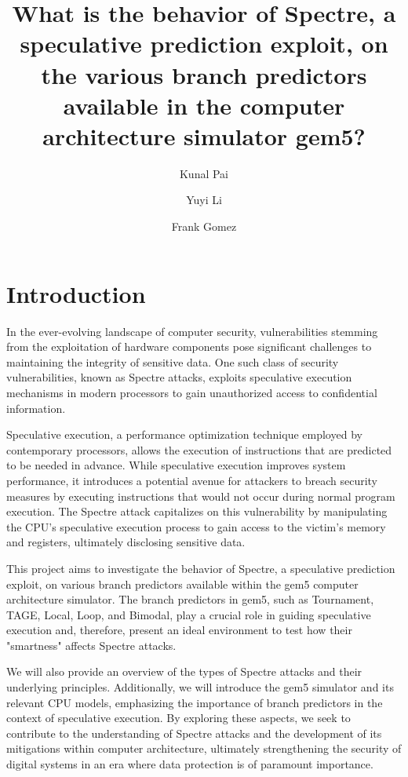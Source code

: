 \documentclass[twocolumn,showpacs,%
  nofootinbib,aps,superscriptaddress,%
  eqsecnum,prd,notitlepage,showkeys,10pt]{revtex4-1}
\begin{document}
\title{What is the behavior of Spectre, a speculative prediction exploit, on the various branch predictors available in the computer architecture simulator gem5?}
\author{Kunal Pai}
\author{Yuyi Li}
\author{Frank Gomez}


\maketitle

\section{Introduction}

In the ever-evolving landscape of computer security, vulnerabilities stemming from the exploitation of hardware components pose significant challenges to maintaining the integrity of sensitive data. One such class of security vulnerabilities, known as Spectre attacks, exploits speculative execution mechanisms in modern processors to gain unauthorized access to confidential information.

Speculative execution, a performance optimization technique employed by contemporary processors, allows the execution of instructions that are predicted to be needed in advance. While speculative execution improves system performance, it introduces a potential avenue for attackers to breach security measures by executing instructions that would not occur during normal program execution. The Spectre attack capitalizes on this vulnerability by manipulating the CPU's speculative execution process to gain access to the victim's memory and registers, ultimately disclosing sensitive data.

This project aims to investigate the behavior of Spectre, a speculative prediction exploit, on various branch predictors available within the gem5 computer architecture simulator. The branch predictors in gem5, such as Tournament, TAGE, Local, Loop, and Bimodal, play a crucial role in guiding speculative execution and, therefore, present an ideal environment to test how their "smartness" affects Spectre attacks.

We will also provide an overview of the types of Spectre attacks and their underlying principles. Additionally, we will introduce the gem5 simulator and its relevant CPU models, emphasizing the importance of branch predictors in the context of speculative execution. By exploring these aspects, we seek to contribute to the understanding of Spectre attacks and the development of its mitigations within computer architecture, ultimately strengthening the security of digital systems in an era where data protection is of paramount importance.
\end{document}
